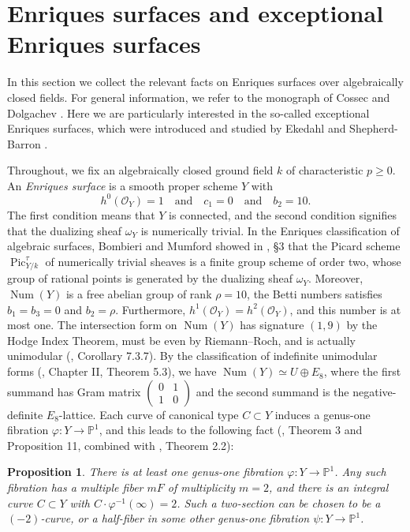 \documentclass[oneside, 12pt]{amsart}
\newcommand\mylabel[1]{\label{#1}\marginpar{\vspace{-1ex}\medskip\medskip\footnotesize \tt #1}}
\renewcommand\mylabel[1]{\label{#1}}
\newtheorem{proposition}[theorem]{Proposition}
\theoremstyle{definition}
\theoremstyle{remark}
\newcommand{\PP}{\mathbb{P}}
\newcommand{\Num}{\operatorname{Num}}
\renewcommand{\O}{\mathscr{O}}
\newcommand{\Pic}{\operatorname{Pic}}
\newcommand{\quadand}{\quad\text{and}\quad}
\newcommand{\ra}{\rightarrow}
\newcommand{\inv}{{-1}}
\begin{document}
\section{Enriques surfaces and exceptional Enriques surfaces}
\mylabel{Enriques surfaces}

In this section we collect the relevant facts on Enriques surfaces over algebraically closed fields. For general information,
we refer to the monograph of Cossec and Dolgachev \cite{Cossec; Dolgachev 1989}. Here we
are particularly interested in the so-called exceptional Enriques surfaces, which were
introduced and studied by Ekedahl and Shepherd-Barron \cite{Ekedahl; Shepherd-Barron 2004}.

Throughout, we fix an algebraically closed ground field $k$ of characteristic $p\geq 0$.
An \emph{Enriques surface}  is a smooth proper  scheme $Y$ with 
$$
h^0(\O_Y)=1\quadand  c_1=0\quadand b_2=10.
$$
The first condition means that $Y$ is connected, and  the second condition
 signifies that the dualizing sheaf $\omega_Y$ is numerically trivial.
In the Enriques classification of algebraic surfaces, Bombieri and Mumford  showed in  \cite{Bombieri; Mumford 1976}, \S 3    that
the   Picard scheme $\Pic^\tau_{Y/k}$ of numerically trivial sheaves is a finite group scheme
of order two, whose group of rational points is generated by the dualizing sheaf $\omega_Y$.
Moreover, $\Num(Y)$ is a  free abelian group of rank $\rho=10$, the Betti numbers satisfies $b_1=b_3=0$ and $b_2=\rho$. 
Furthermore, $h^1(\O_Y)=h^2(\O_Y)$, and this number is at most one.
The intersection form on $\Num(Y)$  has signature $(1,9)$ by the Hodge Index Theorem, must be  even by Riemann--Roch, and is actually 
unimodular (\cite{Illusie 1979}, Corollary 7.3.7). By the classification of indefinite unimodular forms (\cite{Milnor; Husemoller 1973}, Chapter II, Theorem 5.3), 
we have $\Num(Y)\simeq U\oplus E_8$, where the first summand has Gram matrix 
$(\begin{smallmatrix}0&1\\1&0\end{smallmatrix})$  and the second summand is the negative-definite $E_8$-lattice.
Each curve of canonical type $C\subset Y$ induces a genus-one fibration $\varphi:Y\ra\PP^1$, and
this  leads to the following fact (\cite{Bombieri; Mumford 1977}, Theorem 3 and Proposition 11, combined with
 \cite{Lang 1983}, Theorem 2.2):

\begin{proposition}
There is at least one genus-one fibration $\varphi:Y\ra\PP^1$.
Any such fibration has a multiple fiber $mF$ of multiplicity $m=2$,
and there is an integral curve $C\subset Y$ with $C\cdot \varphi^\inv(\infty)=2$.
Such a two-section can be chosen to be  a $(-2)$-curve, or a half-fiber in some other genus-one fibration $\psi:Y\ra\PP^1$.
\end{proposition}
\end{document}
